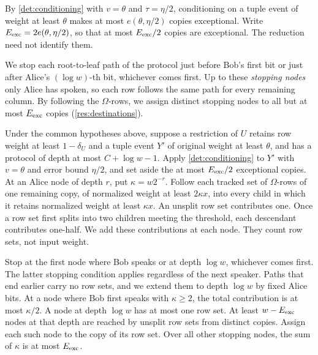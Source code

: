 \documentclass[11pt,letterpaper]{article} \usepackage[utf8]{inputenc}
\theoremstyle{plain} \newtheorem{theorem}{Theorem}[section]
\theoremstyle{definition} \newaliascnt{definition}{theorem}
\begin{document}
By \cref{det:conditioning} with $v=\theta$ and $\tau=\eta/2$, conditioning on
a tuple event of weight at least $\theta$ makes at most $e(\theta,\eta/2)$
copies exceptional. Write $E_{\rm exc}=2e(\theta,\eta/2)$, so that at most
$E_{\rm exc}/2$ copies are exceptional. The reduction need not identify them.

We stop each root-to-leaf path of the protocol just before Bob's first bit or just after Alice's
$(\log w)$-th bit, whichever comes first. Up to these
\emph{stopping nodes} only Alice has spoken, so each row follows the same path
for every remaining column. By following the $\Omega$-rows, we assign distinct
stopping nodes to all but at most $E_{\rm exc}$ copies (\cref{res:destinations}).

\begin{lemma}\label{res:destinations}
Under the common hypotheses above, suppose a restriction of $U$ retains row
weight at least $1-\delta_U$ and a tuple event $Y'$ of original weight at least
$\theta$, and has a protocol of depth at most $C+\log w-1$.
Apply \cref{det:conditioning} to $Y'$ with $v=\theta$ and error bound $\eta/2$, and set aside
the at most $E_{\rm exc}/2$ exceptional copies. At an Alice node of depth $r$, put
$\kappa=w2^{-r}$. Follow each tracked set of $\Omega$-rows of one remaining copy,
of normalized weight at least $2\kappa x$, into every child in which it
retains normalized weight at least $\kappa x$. An unsplit row set
contributes one. Once a row set first splits into two children meeting the
threshold, each descendant contributes one-half. We add these
contributions at each node. They count row sets, not input weight.

Stop at the first node where Bob speaks or at depth $\log w$, whichever comes first.
The latter stopping condition applies regardless of the next speaker.
Paths that end earlier carry no row sets, and we extend them to depth
$\log w$ by fixed Alice bits. At a node where Bob
first speaks with $\kappa\ge2$, the total contribution is at most $\kappa/2$.
A node at depth $\log w$ has at most one row set. At least $w-E_{\rm exc}$
nodes at that depth are reached by unsplit row sets from distinct copies. Assign each
such node to the copy of its row set. Over all other stopping nodes,
the sum of $\kappa$ is at most $E_{\rm exc}$.
\end{lemma}
\end{document}
